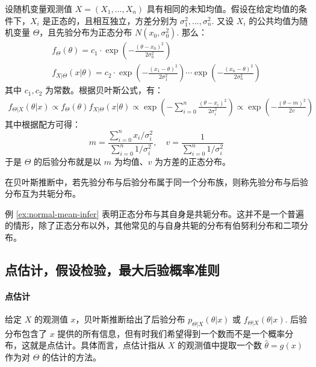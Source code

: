 \begin{example}[正态随机变量公共均值的推断]
\label{ex:normal-mean-infer}
设随机变量观测值 $X=(X_1,\ldots,X_n)$ 具有相同的未知均值。假设在给定均值的条件下，$X_i$ 是正态的，且相互独立，方差分别为 $\sigma_1^2,\ldots,\sigma_n^2$. 又设 $X_i$ 的公共均值为随机变量 $\Theta$，且先验分布为正态分布 $N(x_0,\sigma_0^2)$. 那么：
\begin{gather*}
f_\Theta(\theta)=c_1\cdot\exp\left(-\frac{(\theta-x_0)^2}{2\sigma_0^2}\right)\\
f_{X\vert\Theta}(x\vert\theta)=c_2\cdot\exp\left(-\frac{(x_1-\theta)^2}{2\sigma_1^2}\right)\cdots\exp\left(-\frac{(x_n-\theta)^2}{2\sigma_n^2}\right)
\end{gather*}
其中 $c_1,c_2$ 为常数。根据贝叶斯公式，有：
\begin{align*}
f_{\Theta\vert X}(\theta\vert x)\propto f_\Theta(\theta)f_{X\vert\Theta}(x\vert\theta)\propto\exp\left(-\sum_{i=0}^n\frac{(\theta-x_i)^2}{2\sigma_i^2}\right)\propto\exp\left(-\frac{(\theta-m)^2}{2v}\right)
\end{align*}
其中根据配方可得：
\[
m=\frac{\sum_{i=0}^nx_i/\sigma_i^2}{\sum_{i=0}^n1/\sigma_i^2},\quad v=\frac{1}{\sum_{i=0}^n1/\sigma_i^2}
\]
于是 $\Theta$ 的后验分布就是以 $m$ 为均值、$v$ 为方差的正态分布。
\end{example}

\begin{definition}[共轭分布]
在贝叶斯推断中，若先验分布与后验分布属于同一个分布族，则称先验分布与后验分布互为共轭分布。
\end{definition}
\begin{com}
例 \ref{ex:normal-mean-infer} 表明正态分布与其自身是共轭分布。这并不是一个普遍的情形，除了正态分布以外，其他常见的与自身共轭的分布有伯努利分布和二项分布。
\end{com}


\subsection{点估计，假设检验，最大后验概率准则}

\paragraph{点估计}
给定 $X$ 的观测值 $x$，贝叶斯推断给出了后验分布 $p_{\Theta\vert X}(\theta\vert x)$ 或 $f_{\Theta\vert X}(\theta\vert x)$. 后验分布包含了 $x$ 提供的所有信息，但有时我们希望得到一个数而不是一个概率分布，这就是点估计。具体而言，点估计指从 $X$ 的观测值中提取一个数 $\hat\theta=g(x)$ 作为对 $\Theta$ 的估计的方法。

